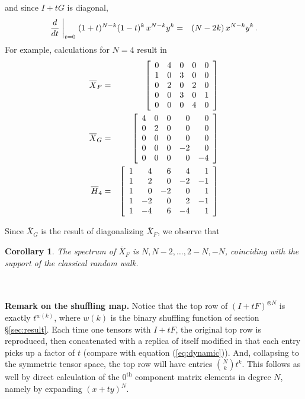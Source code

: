 \documentclass[12pt]{article}
\newtheorem{corollary}[theorem]{Corollary}
\def\dir#1.{x^{N-{#1}}y^{#1}}
\numberwithin{equation}{section}
\begin{document}
and since $I+tG$ is diagonal,
\begin{eqnarray*}
    \frac{d}{dt}\biggm|_{t=0}(1+t)^{N-k}(1-t)^k\,\dir k.
                     &=& (N-2k)\,\dir k. \,.
\end{eqnarray*}
For example, calculations for $N=4$ result in
%
\begin{eqnarray}\label{eq:symmats}
\overline{X}_F &=& \left[
         \begin{array}{ccccc}0&4&0&0&0\cr 
                  1&0&3&0&0\cr 
                  0&2&0&2&0\cr 
                  0&0&3&0&1\cr
                  0&0&0&4&0\cr\end{array}\right]\\
\overline{X}_G  &=& \left[\begin{array}{rrrrr}4&0&0&0&0\cr
                     0&2&0&0&0\cr
                     0&0&0&0&0\cr
                     0&0&0&-2&0\cr
                     0&0&0&0&-4\cr\end{array}\right] \\
\overline{H}_4 &=& \left[\begin{array}{rrrrr}
                    1&4&6&4&1\cr
                    1&2&0&-2&-1\cr 
                    1&0&-2&0&1\cr
                    1&-2&0&2&-1\cr
                    1&-4&6&-4&1\cr \end{array} \right]
 \label{eq:symm2}
\end{eqnarray}
%
\bigskip

Since $\overline{X}_G$ is the result of diagonalizing
$\overline{X}_F$, we observe that\bigskip

\begin{corollary}
The spectrum of $\overline{X}_F$ is
$N,N-2,\ldots,2-N,-N$, coinciding with the support 
of the classical random walk.
\end{corollary}
~
\\
\\

\noindent
{\bf Remark on the shuffling map. }
Notice that the top row of $(I+tF)^{\otimes N}$ is exactly $t^{w(k)}$, where
$w(k)$ is the binary shuffling function of section \S\ref{sec:result}. 
Each time one tensors with $I+tF$, 
the original top row is reproduced, then  concatenated with a replica 
of itself modified in that each entry picks up a factor of $t$ 
(compare with equation (\ref{eq:dynamic})).
And, collapsing to the symmetric tensor space,
the top row will have entries ${N\choose k}t^k$. This
follows as well by direct calculation of the $0^{\mathrm{th}}$ component
matrix elements in degree $N$, namely by expanding $(x+ty)^N$.\\
\end{document}
